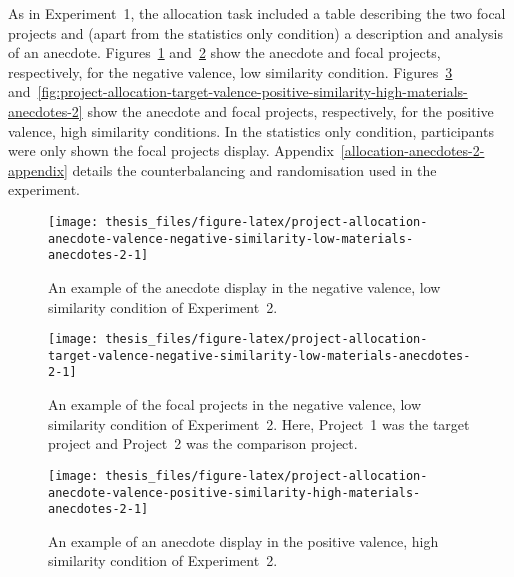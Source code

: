 \documentclass[a4paper, nobind]{templates/ociamthesis}
\theoremstyle{definition}
\theoremstyle{definition}
\theoremstyle{definition}
\theoremstyle{definition}
\theoremstyle{remark}
\begin{document}
As in Experiment~1, the allocation task included a table describing the two
focal projects and (apart from the statistics only condition) a description and
analysis of an anecdote.
Figures~\ref{fig:project-allocation-anecdote-valence-negative-similarity-low-materials-anecdotes-2}
and~\ref{fig:project-allocation-target-valence-negative-similarity-low-materials-anecdotes-2}
show the anecdote and focal projects, respectively, for the negative valence,
low similarity condition.
Figures~\ref{fig:project-allocation-anecdote-valence-positive-similarity-high-materials-anecdotes-2}
and~\ref{fig:project-allocation-target-valence-positive-similarity-high-materials-anecdotes-2}
show the anecdote and focal projects, respectively, for the positive valence,
high similarity conditions. In the statistics only condition, participants were
only shown the focal projects display.
Appendix~\ref{allocation-anecdotes-2-appendix} details the counterbalancing and
randomisation used in the experiment.



\begin{figure}
\texttt{[image: thesis\_files/figure-latex/project-allocation-anecdote-valence-negative-similarity-low-materials-anecdotes-2-1]} \caption{An example of the anecdote display in the negative valence, low similarity condition of Experiment~2.}\label{fig:project-allocation-anecdote-valence-negative-similarity-low-materials-anecdotes-2}
\end{figure}



\begin{figure}
\texttt{[image: thesis\_files/figure-latex/project-allocation-target-valence-negative-similarity-low-materials-anecdotes-2-1]} \caption{An example of the focal projects in the negative valence, low similarity condition of Experiment~2. Here, Project~1 was the target project and Project~2 was the comparison project.}\label{fig:project-allocation-target-valence-negative-similarity-low-materials-anecdotes-2}
\end{figure}



\begin{figure}
\texttt{[image: thesis\_files/figure-latex/project-allocation-anecdote-valence-positive-similarity-high-materials-anecdotes-2-1]} \caption{An example of an anecdote display in the positive valence, high similarity condition of Experiment~2.}\label{fig:project-allocation-anecdote-valence-positive-similarity-high-materials-anecdotes-2}
\end{figure}
\end{document}
